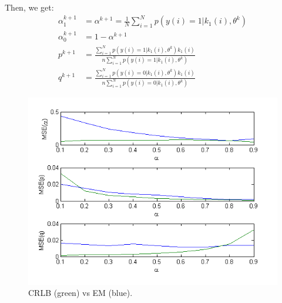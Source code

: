 Then, we get:
\begin{align*}
\alpha_1^{k+1} &= \alpha^{k+1} = \frac{1}{N} \sum_{i=1}^{N} p(y(i) = 1 | k_1(i), \theta^{k}) \\
\alpha_0^{k+1} &= 1 - \alpha^{k+1} \\
p^{k+1} &= \frac{\sum_{i=1}^{N} p(y(i) = 1 | k_1(i), \theta^{k}) k_1(i)}{n \sum_{i=1}^{N} p(y(i) = 1 | k_1(i), \theta^{k})} \\
q^{k+1} &= \frac{\sum_{i=1}^{N} p(y(i) = 0 | k_1(i), \theta^{k}) k_1(i)}{n \sum_{i=1}^{N} p(y(i) = 0 | k_1(i), \theta^{k})}
\end{align*}


\begin{figure}[!htbp]
	\centering
	\includegraphics[width=\columnwidth]{images/EM_plot.png} %
	\vspace{-1pt}
	\caption{CRLB (green) vs EM (blue).}
	\vspace{-2pt}
	\label{figure:crlb-em}
\end{figure}

